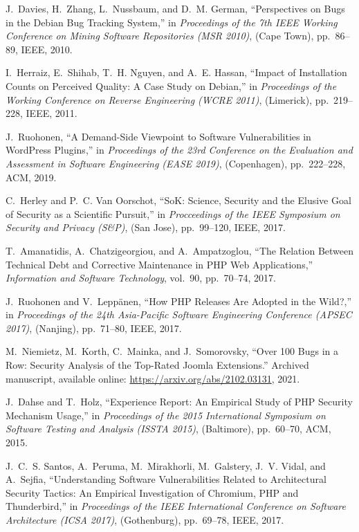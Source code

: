 \documentclass[5p, twocolumn, numbers, sort]{elsarticle}
\begin{document}
\begin{thebibliography}{10}
J.~Davies, H.~Zhang, L.~Nussbaum, and D.~M. German, ``{P}erspectives on {B}ugs
  in the {D}ebian {B}ug {T}racking {S}ystem,'' in {\em Proceedings of the 7th
  IEEE Working Conference on Mining Software Repositories (MSR 2010)}, (Cape
  Town), pp.~86--89, IEEE, 2010.

I.~Herraiz, E.~Shihab, T.~H. Nguyen, and A.~E. Hassan, ``{I}mpact of
  {I}nstallation {C}ounts on {P}erceived {Q}uality: {A} {C}ase {S}tudy on
  {D}ebian,'' in {\em Proceedings of the Working Conference on Reverse
  Engineering (WCRE 2011)}, (Limerick), pp.~219--228, IEEE, 2011.

J.~Ruohonen, ``{A} {D}emand-{S}ide {V}iewpoint to {S}oftware {V}ulnerabilities
  in {W}ord{P}ress {P}lugins,'' in {\em Proceedings of the 23rd Conference on
  the Evaluation and Assessment in Software Engineering (EASE 2019)},
  (Copenhagen), pp.~222--228, ACM, 2019.

C.~Herley and P.~C. {Van Oorschot}, ``{S}o{K}: {S}cience, {S}ecurity and the
  {E}lusive {G}oal of {S}ecurity as a {S}cientific {P}ursuit,'' in {\em
  {P}rocceedings of the {IEEE} {S}ymposium on {S}ecurity and {P}rivacy (S\&P)},
  (San Jose), pp.~99--120, IEEE, 2017.

T.~Amanatidis, A.~Chatzigeorgiou, and A.~Ampatzoglou, ``{T}he {R}elation
  {B}etween {T}echnical {D}ebt and {C}orrective {M}aintenance in {PHP} {W}eb
  {A}pplications,'' {\em Information and Software Technology}, vol.~90,
  pp.~70--74, 2017.

J.~Ruohonen and V.~Lepp\"anen, ``{H}ow {PHP} {R}eleases {A}re {A}dopted in the
  {W}ild?,'' in {\em Proceedings of the 24th Asia-Pacific Software Engineering
  Conference (APSEC 2017)}, (Nanjing), pp.~71--80, IEEE, 2017.

M.~Niemietz, M.~Korth, C.~Mainka, and J.~Somorovsky, ``{O}ver 100 {B}ugs in a
  {R}ow: {S}ecurity {A}nalysis of the {T}op-{R}ated {J}oomla {E}xtensions.''
  {A}rchived manuscript, available online:
  \url{https://arxiv.org/abs/2102.03131}, 2021.

J.~Dahse and T.~Holz, ``{E}xperience {R}eport: {A}n {E}mpirical {S}tudy of
  {PHP} {S}ecurity {M}echanism {U}sage,'' in {\em Proceedings of the 2015
  International Symposium on Software Testing and Analysis (ISSTA 2015)},
  (Baltimore), pp.~60--70, ACM, 2015.

J.~C.~S. Santos, A.~Peruma, M.~Mirakhorli, M.~Galstery, J.~V. Vidal, and
  A.~Sejfia, ``{U}nderstanding {S}oftware {V}ulnerabilities {R}elated to
  {A}rchitectural {S}ecurity {T}actics: {A}n {E}mpirical {I}nvestigation of
  {C}hromium, {PHP} and {T}hunderbird,'' in {\em Proceedings of the IEEE
  International Conference on Software Architecture (ICSA 2017)}, (Gothenburg),
  pp.~69--78, IEEE, 2017.


\end{thebibliography}
\end{document}
